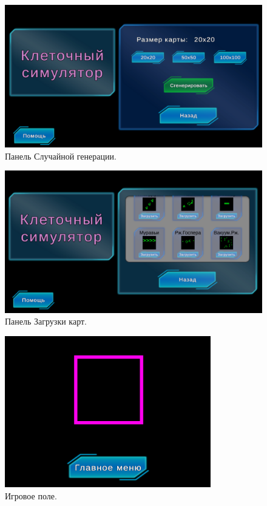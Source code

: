 \documentclass[14pt, oneside]{altsu-report}
\begin{document}
\begin{figure}[H]
	\centering
	\includegraphics[width=1\textwidth]{images/rand1.png}  
	\caption{Панель Случайной генерации.}
	\label{rand}
\end{figure}

\begin{figure}[H]
	\centering
	\includegraphics[width=1\textwidth]{images/downld.png}  
	\caption{Панель Загрузки карт.}
	\label{downl}
\end{figure}

\begin{figure}[H]
	\centering
	\includegraphics[width=0.8\textwidth]{images/map.png}  
	\caption{Игровое поле.}
	\label{map}
\end{figure}
\end{document}
